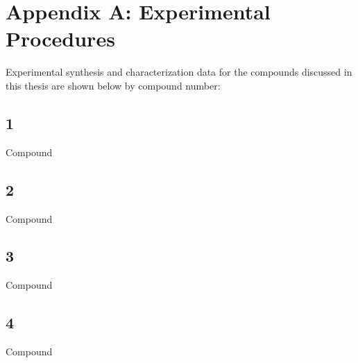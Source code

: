 \chapter{Appendix A: Experimental Procedures} \label{chap:appA}

Experimental synthesis and characterization data for the compounds discussed in this thesis are shown below by compound number:

\section{1} \label{sec:c1}
Compound 

\section{2} \label{sec:c2}
Compound

\section{3} \label{sec:c3}
Compound

\section{4} \label{sec:c4}
Compound